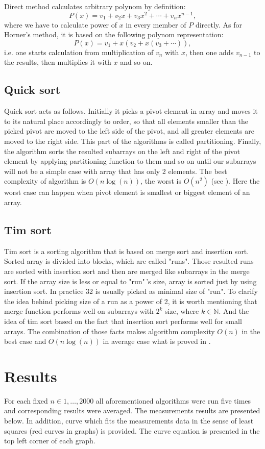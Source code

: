 \documentclass[12pt, bachelor, substylefile = algo_title.rtx]{disser}
\theoremstyle{definition}
\begin{document}
Direct method calculates arbitrary polynom by definition:
\[ P(x) = v_1 + v_2x + v_3x^2 + \cdots + v_nx^{n-1}, \]
where we have to calculate power of $x$ in every member of $P$ directly. As for Horner's method, it is based on the following polynom representation:
\[ P(x) = v_1 + x(v_2 + x(v_3 + \cdots)), \]
i.e. one starts calculation from multiplication of $v_n$ with $x$, then one adds $v_{n-1}$ to the results, then multiplies it with $x$ and so on.

\subsection{Quick sort}
Quick sort acts as follows. Initially it picks a pivot element in array and moves it to its natural place accordingly to order, so that all elements smaller than the picked pivot are moved to the left side of the pivot, and all greater elements are moved to the right side. This part of the algorithms is called partitioning. Finally, the algorithm sorts the resulted subarrays on the left and right of the pivot element by applying partitioning function to them and so on until our subarrays will not be a simple case with array that has only 2 elements. The best complexity of algorithm is $O(n \log(n))$, the worst is $O(n^2)$ (see \cite{Wang11}). Here the worst case can happen when pivot element is smallest or biggest element of an array.

\subsection{Tim sort}

Tim sort is a sorting algorithm that is based on merge sort and insertion sort. Sorted array is divided into blocks, which are called "runs". Those resulted runs are sorted with insertion sort and then are merged like subarrays in the merge sort. If the array size is less or equal to "run"\,'s size, 
array is sorted just by using insertion sort. In practice 32 is usually picked as minimal size of "run". To clarify the idea behind picking size of a run as a power of 2, it is worth mentioning that merge function performs well on subarrays with $2^k$ size, where $k \in \mathbb{N}$. 
And the idea of tim sort based on the fact that insertion sort performs well for small arrays.  The combination of those facts makes algorithm complexity $O(n)$ in the best case and $O(n \log(n))$ in average case what is proved in \cite{Buss18}.

\section{Results}
For each fixed $n \in 1,\dots,2000$ all aforementioned algorithms were run five times and corresponding results were averaged. The measurements results are presented below. In addition, curve which fits the measurements data in the sense of least squares (red curves in graphs) is provided. The curve equation is presented in the top left corner of each graph.
\end{document}
